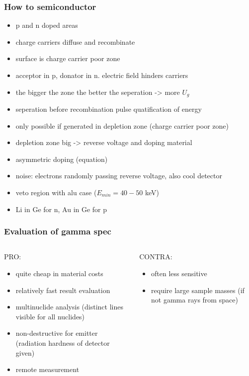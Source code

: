 \documentclass[aspectratio=1610, 9pt]{beamer}
\begin{document}
\begin{frame}\frametitle{How to semiconductor}
  \begin{itemize}
    \item p and n doped areas
    \item charge carriers diffuse and recombinate
    \item surface is charge carrier poor zone
    \item acceptor in p, donator in n. electric field hinders carriers
    \item the bigger the zone the better the seperation -> more $U_g$
    \item seperation before recombination \to pulse \to quatification of energy
    \item only possible if generated in depletion zone (charge carrier poor zone)
    \item depletion zone big -> reverse voltage and doping material
    \item asymmetric doping (equation)
    \item noise: electrons randomly passing reverse voltage, also cool detector
    \item veto region with alu case ($E_{min} = 40 - 50$ keV)
    \item Li in Ge for n, Au in Ge for p
  \end{itemize}
\end{frame}

\begin{frame}\frametitle{Evaluation of gamma spec}
  \begin{columns}
    \begin{column}[c]{0.48\textwidth}
      PRO:
      \begin{itemize}
        \item quite cheap in material costs
        \item relatively fast result evaluation
        \item multinuclide analysis (distinct lines visible for all nuclides)
        \item non-destructive for emitter (radiation hardness of detector given)
        \item remote measurement
      \end{itemize}
    \end{column}
    \begin{column}[c]{0.48\textwidth}
      CONTRA:
      \begin{itemize}
        \item often less sensitive
        \item require large sample masses (if not gamma rays from space)
      \end{itemize}
    \end{column}
  \end{columns}
\end{frame}
\end{document}
